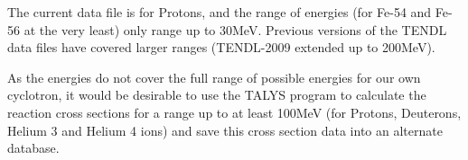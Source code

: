 \documentclass[12pt,twoside]{manual}
\begin{document}
The current data file is for Protons, and the range of energies (for Fe-54 and Fe-56 at the very least) only range up to 30MeV.  Previous versions of the TENDL data files have covered larger ranges (TENDL-2009 extended up to 200MeV).

As the energies do not cover the full range of possible energies for our own cyclotron, it would be desirable to use the TALYS program to calculate the reaction cross sections for a range up to at least 100MeV (for Protons, Deuterons, Helium 3 and Helium 4 ions) and save this cross section data into an alternate database.









\printbibliography
\end{document}
